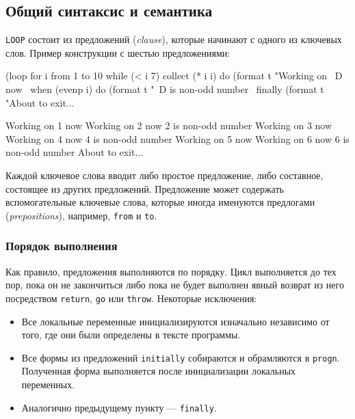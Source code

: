 \subsection{Общий синтаксис и семантика}
\lstinline{LOOP} состоит из предложений (\emph{clause}), которые начинают с одного из ключевых слов. Пример конструкции с шестью предложениями:
\begin{cllst}{}{}
(loop for i from 1 to 10
   while (< i 7)
   collect (* i i)
   do (format t "Working on ~D now~%
   when (evenp i)
     do (format t "~D is non-odd number~%
   finally (format t "About to exit...~%
\end{cllst}
\begin{plainlst}{}{}
Working on 1 now
Working on 2 now
2 is non-odd number
Working on 3 now
Working on 4 now
4 is non-odd number
Working on 5 now
Working on 6 now
6 is non-odd number
About to exit...
\end{plainlst}

Каждой ключевое слова вводит либо простое предложение, либо составное, состоящее из других предложений. Предложение может содержать вспомогательные ключевые слова, которые иногда именуются предлогами (\emph{prepositions}), например, \lstinline{from} и \lstinline{to}.

\subsubsection{Порядок выполнения}
Как правило, предложения выполняются по порядку. Цикл выполняется до тех пор, пока он не закончиться либо пока не будет выполнен явный возврат из него посредством \lstinline{return}, \lstinline{go} или \lstinline{throw}. Некоторые исключения:
\begin{itemize}
  \item Все локальные переменные инициализируются изначально независимо от того, где они были определены в тексте программы.
  \item Все формы из предложений \lstinline{initially} собираются и обрамляются в \lstinline{progn}. Полученная форма выполняется после инициализации локальных переменных.
  \item Аналогично предыдущему пункту — \lstinline{finally}.
\end{itemize}

